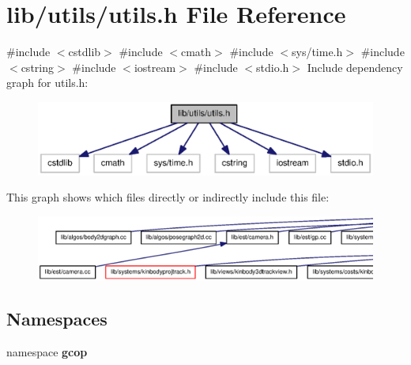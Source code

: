 \section{lib/utils/utils.h \-File \-Reference}
\label{utils_8h}
{\ttfamily \#include $<$cstdlib$>$}\*
{\ttfamily \#include $<$cmath$>$}\*
{\ttfamily \#include $<$sys/time.\-h$>$}\*
{\ttfamily \#include $<$cstring$>$}\*
{\ttfamily \#include $<$iostream$>$}\*
{\ttfamily \#include $<$stdio.\-h$>$}\*
\-Include dependency graph for utils.\-h\-:\nopagebreak
\begin{figure}[H]
\begin{center}
\leavevmode
\includegraphics[width=350pt]{utils_8h__incl}
\end{center}
\end{figure}
\-This graph shows which files directly or indirectly include this file\-:
\nopagebreak
\begin{figure}[H]
\begin{center}
\leavevmode
\includegraphics[width=350pt]{utils_8h__dep__incl}
\end{center}
\end{figure}
\subsection*{\-Namespaces}
\begin{DoxyCompactItemize}
\item 
namespace {\bf gcop}
\end{DoxyCompactItemize}
